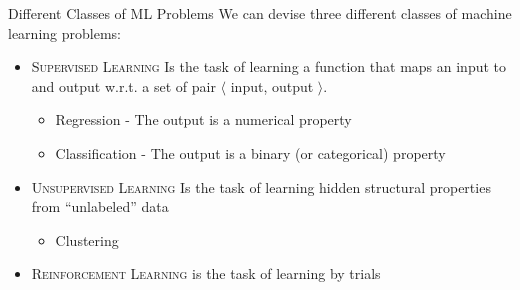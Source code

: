 \documentclass{beamer}
\begin{document}
\begin{frame}{Different Classes of ML Problems}
\large
We can devise three different classes of machine learning problems:
\begin{itemize}
\item \textsc{Supervised Learning}
Is the task of learning a function that maps an input to and output w.r.t. a set of
pair $\langle$ input, output $\rangle$.  

	\begin{itemize}
    	\item Regression - The output is a numerical property
        \item Classification - The output is a binary (or categorical) property
    \end{itemize}

\item \textsc{Unsupervised Learning} 
Is the task of learning hidden structural properties from ``unlabeled'' data

	\begin{itemize}
		\item Clustering 
	\end{itemize}
\item \textsc{Reinforcement Learning} is the task of learning by trials
\end{itemize}
\end{frame}
\end{document}
